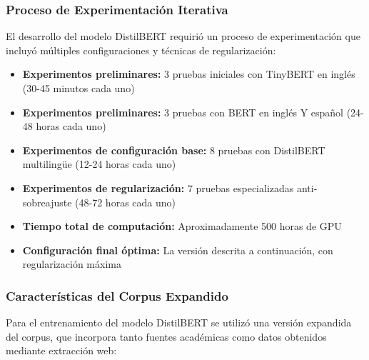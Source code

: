 \subsubsection{Proceso de Experimentación Iterativa}

El desarrollo del modelo DistilBERT requirió un proceso de experimentación que incluyó múltiples configuraciones y técnicas de regularización:

\begin{itemize}
    \item \textbf{Experimentos preliminares:} 3 pruebas iniciales con TinyBERT en inglés (30-45 minutos cada uno)
    \item \textbf{Experimentos preliminares:} 3 pruebas con BERT en inglés Y español (24-48 horas cada uno)
    \item \textbf{Experimentos de configuración base:} 8 pruebas con DistilBERT multilingüe (12-24 horas cada uno)
    \item \textbf{Experimentos de regularización:} 7 pruebas especializadas anti-sobreajuste (48-72 horas cada uno)
    \item \textbf{Tiempo total de computación:} Aproximadamente 500 horas de GPU
    \item \textbf{Configuración final óptima:} La versión descrita a continuación, con regularización máxima
\end{itemize}

\subsubsection{Características del Corpus Expandido}

Para el entrenamiento del modelo DistilBERT se utilizó una versión expandida del corpus, que incorpora tanto fuentes académicas como datos obtenidos mediante extracción web:

\begin{table}[htbp]
\centering
{}
\caption{Composición del corpus expandido utilizado para el entrenamiento de DistilBERT.}
\label{tab:corpus_expandido_distilbert}
\end{table}


